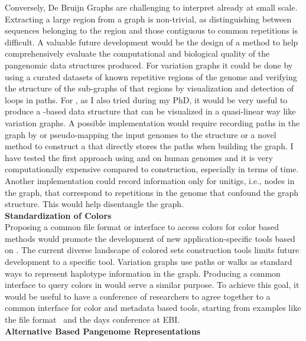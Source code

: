 Conversely, De Bruijn Graphs are challenging to interpret already at small scale. Extracting a large region from a graph is non-trivial, as distinguishing between sequences belonging to the region and those contiguous to common repetitions is difficult.
A valuable future development would be the design of a method to help comprehensively evaluate the computational and biological quality of the pangenomic data structures produced. For variation graphs it could be done by using a curated datasets of known repetitive regions of the genome and verifying the structure of the sub-graphs of that regions by visualization and detection of loops in paths. For \dbgs, as I also tried during my PhD, it would be very useful to produce a \dbg-based data structure that can be visualized in a quasi-linear way like variation graphs. A possible implementation would require recording paths in the graph by or pseudo-mapping the input genomes to the \ccdbg structure or a novel method to construct a \cdbg that directly stores the paths when building the graph. I have tested the first approach using \ggcat and \ssh on human genomes and it is very computationally expensive compared to \ccdbg construction, especially in terms of time. Another implementation could record information only for unitigs, i.e., nodes in the graph, that correspond to repetitions in the genome that confound the graph structure. This would help disentangle the graph.\\
\textbf{Standardization of \dbg Colors}\\
Proposing a common file format or interface to access colors for color \dbg based methods would promote the development of new application-specific tools based on \kmers. The current diverse landscape of colored \kmer sets construction tools limits future development to a specific tool. Variation graphs use paths or walks as standard ways to represent haplotype information in the graph. Producing a common interface to query colors in \dbgs would serve a similar purpose. To achieve this goal, it would be useful to have a conference of \kmer researchers to agree together to a common interface for color and metadata based tools, starting from examples like the \kmer file format~\cite{kff} and the \kmer days conference at EBI.\\
\textbf{Alternative \kmer Based Pangenome Representations}\\
